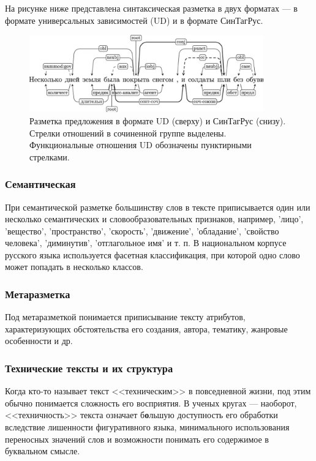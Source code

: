 На рисунке ниже представлена синтаксическая разметка в двух форматах --- в формате универсальных зависимостей (UD) и в формате СинТагРус.

\begin{figure}[H]
	\centering
	\includegraphics[width=0.9\textwidth]{img/syntax.png}
	\caption{Разметка предложения в формате UD (сверху) и СинТагРус (снизу). Стрелки отношений в сочиненной группе выделены. Функциональные отношения UD обозначены пунктирными стрелками.}
	\label{fig:syn}
\end{figure}

\subsubsection*{Семантическая}

При семантической разметке большинству слов в тексте приписывается один или несколько семантических и словообразовательных признаков, например, 'лицо', 'вещество', 'пространство', 'скорость', 'движение', 'обладание', 'свойство человека', 'диминутив', 'отглагольное имя' и т. п.
В национальном корпусе русского языка \cite{ruscorpora} используется фасетная классификация, при которой одно слово может попадать в несколько классов.

\subsubsection*{Метаразметка}

Под метаразметкой понимается приписывание тексту атрибутов, характеризующих обстоятельства его создания, автора, тематику, жанровые особенности и др. \cite{ruscorpora}

\subsubsection{Технические тексты и их структура}

Когда кто-то называет текст <<техническим>> в повседневной жизни, под этим обычно понимается сложность его восприятия.
В ученых кругах --- наоборот, <<техничность>> текста означает б\textbf{о}льшую доступность его обработки вследствие лишенности фигуративного языка, минимального использования переносных значений слов и возможности понимать его содержимое в буквальном смысле. \cite{tt}

